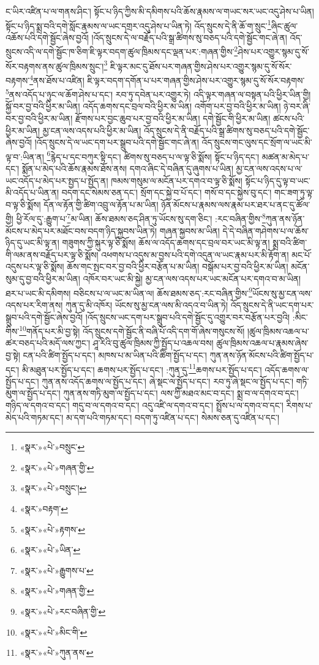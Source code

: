 ང་ཡིར་འཛིན་པ་ལ་གནས་ཤིང་། སྟོང་པ་ཉིད་ཀྱིས་མི་དམིགས་པའི་ཆོས་རྣམས་ལ་གཡང་སར་ཡང་འདུ་ཤེས་པ་ཡིན། སྟོང་པ་ཉིད་སྨྲ་བའི་དགེ་སློང་རྣམས་ལ་ཡང་དགྲར་འདུ་ཤེས་པ་ཡིན་ཏེ། འོད་སྲུངས་དེ་ནི་ཆོ་ག་སྲུང་\footnote{«སྣར་»«པེ་»བསྲུང་}ཞིང་ཚུལ་འཆོས་པའི་དགེ་སྦྱོང་ཞེས་བྱའོ། །འོད་སྲུངས་དེ་ལ་བརྗོད་པའི་སྒྲ་ཚིགས་སུ་བཅད་པའི་དགེ་སྦྱོང་གང་ཞེ་ན། འོད་སྲུངས་འདི་ལ་དགེ་སྦྱོང་ཁ་ཅིག་ཇི་ལྟར་བདག་ཚུལ་ཁྲིམས་དང་ལྡན་པར་:གཞན་གྱིས་\footnote{«སྣར་»«པེ་»གཞན་གྱི་}ཤེས་པར་འགྱུར་སྙམ་དུ་སོ་སོར་བརྟགས་ནས་ཚུལ་ཁྲིམས་སྲུང་།\footnote{«སྣར་»«པེ་»བསྲུང་།} ཇི་ལྟར་མང་དུ་ཐོས་པར་གཞན་གྱིས་ཤེས་པར་འགྱུར་སྙམ་དུ་སོ་སོར་བརྟགས་\footnote{«སྣར་»བརྟག་}ནས་ཐོས་པ་འཛིན། ཇི་ལྟར་བདག་དགོན་པ་པར་གཞན་གྱིས་ཤེས་པར་འགྱུར་སྙམ་དུ་སོ་སོར་བརྟགས་\footnote{«སྣར་»«པེ་»རྟགས་}ནས་འདོད་པ་ཉུང་ལ་ཆོག་ཤེས་པ་དང་། རབ་ཏུ་དབེན་པར་འགྱུར་ཏེ། འདི་ལྟར་གཞན་ལ་བསྟན་པའི་ཕྱིར་ཡིན་གྱི། སྐྱོ་བར་བྱ་བའི་ཕྱིར་མ་ཡིན། འདོད་ཆགས་དང་བྲལ་བའི་ཕྱིར་མ་ཡིན། འགོག་པར་བྱ་བའི་ཕྱིར་མ་ཡིན། ཉེ་བར་ཞི་བར་བྱ་བའི་ཕྱིར་མ་ཡིན། རྫོགས་པར་བྱང་ཆུབ་པར་བྱ་བའི་ཕྱིར་མ་ཡིན། དགེ་སྦྱོང་གི་ཕྱིར་མ་ཡིན། ཚངས་པའི་ཕྱིར་མ་ཡིན། མྱ་ངན་ལས་འདས་པའི་ཕྱིར་མ་ཡིན། འོད་སྲུངས་དེ་ནི་བརྗོད་པའི་སྒྲ་ཚིགས་སུ་བཅད་པའི་དགེ་སྦྱོང་ཞེས་བྱའོ། །འོད་སྲུངས་དེ་ལ་ཡང་དག་པར་སྒྲུབ་པའི་དགེ་སྦྱོང་གང་ཞེ་ན། འོད་སྲུངས་གང་ལུས་དང་སྲོག་ལ་ཡང་མི་ལྟ་བ་:ཡིན་ན། \footnote{«སྣར་»«པེ་»ཡིན་}རྙེད་པ་དང་བཀུར་སྟི་དང་། ཚིགས་སུ་བཅད་པ་ལ་ལྟ་ཅི་སྨོས། སྟོང་པ་ཉིད་དང་། མཚན་མ་མེད་པ་དང་། སྨོན་པ་མེད་པའི་ཆོས་རྣམས་ཐོས་ནས། དགའ་ཞིང་དེ་བཞིན་དུ་ཞུགས་པ་ཡིན། མྱ་ངན་ལས་འདས་པ་ལ་ཡང་འདོད་པ་མེད་པར་སྤྱད་པ་སྤྱོད་ན། ཁམས་གསུམ་ལ་མངོན་པར་དགའ་བ་ལྟ་ཅི་སྨོས། སྟོང་པ་ཉིད་དུ་ལྟ་བ་ཡང་མི་འདོད་པ་ཡིན་ན། བདག་དང་སེམས་ཅན་དང་། སྲོག་དང་སྐྱེ་བ་པོ་དང་། གསོ་བ་དང་སྐྱེས་བུ་དང་། གང་ཟག་ཏུ་ལྟ་བ་ལྟ་ཅི་སྨོས། དོན་ལ་རྟོན་གྱི་ཚིག་འབྲུ་ལ་རྟོན་པ་མ་ཡིན། ཉོན་མོངས་པ་རྣམས་ལས་རྣམ་པར་ཐར་པ་ནང་དུ་ཚོལ་གྱི། ཕྱི་རོལ་དུ་:རྒྱུག་པ་\footnote{«སྣར་»«པེ་»རྒྱུགས་པ་}མ་ཡིན། ཆོས་ཐམས་ཅད་ཤིན་ཏུ་ཡོངས་སུ་དག་ཅིང་། :རང་བཞིན་གྱིས་\footnote{«སྣར་»«པེ་»གཞན་གྱི་}ཀུན་ནས་ཉོན་མོངས་པ་མེད་པར་མཐོང་བས་བདག་ཉིད་སྐྱབས་ཡིན་ཏེ། གཞན་སྐྱབས་མ་ཡིན། དེ་དེ་བཞིན་གཤེགས་པ་ལ་ཆོས་ཉིད་དུ་ཡང་མི་ལྟ་ན། གཟུགས་ཀྱི་སྐུར་ལྟ་ཅི་སྨོས། ཆོས་ལ་འདོད་ཆགས་དང་བྲལ་བར་ཡང་མི་ལྟ་ན། སྨྲ་བའི་ཚིག་གི་ལམ་ནས་བརྗོད་པར་ལྟ་ཅི་སྨོས། འཕགས་པ་འདུས་མ་བྱས་པའི་དགེ་འདུན་ལ་ཡང་རྣམ་པར་མི་རྟོག་ན། མང་པོ་འདུས་པར་ལྟ་ཅི་སྨོས། ཆོས་གང་སྤང་བར་བྱ་བའི་ཕྱིར་བརྩོན་པ་མ་ཡིན། བསྒོམ་པར་བྱ་བའི་ཕྱིར་མ་ཡིན། མངོན་སུམ་དུ་བྱ་བའི་ཕྱིར་མ་ཡིན། འཁོར་བར་ཡང་མི་སྐྱེ། མྱ་ངན་ལས་འདས་པར་ཡང་མངོན་པར་དགའ་བ་མ་ཡིན། ཐར་པ་ཡང་མི་དམིགས། བཅིངས་པ་ལ་ཡང་མ་ཡིན་ལ། ཆོས་ཐམས་ཅད་:རང་བཞིན་གྱིས་\footnote{«སྣར་»«པེ་»རང་བཞིན་གྱི་}ཡོངས་སུ་མྱ་ངན་ལས་འདས་པར་རིག་ནས། ཀུན་དུ་མི་འཁོར། ཡོངས་སུ་མྱ་ངན་ལས་མི་འདའ་བ་ཡིན་ཏེ། འོད་སྲུངས་དེ་ནི་ཡང་དག་པར་སྒྲུབ་པའི་དགེ་སྦྱོང་ཞེས་བྱའོ། །འོད་སྲུངས་ཡང་དག་པར་སྒྲུབ་པའི་དགེ་སྦྱོང་དུ་འགྱུར་བར་བརྩོན་པར་བྱའི། :མིང་གིས་\footnote{«སྣར་»«པེ་»མིང་གི་}གནོད་པར་མི་བྱ་སྟེ། འོད་སྲུངས་དགེ་སྦྱོང་ནི་བཞི་པོ་འདི་དག་གོ་ཞེས་གསུངས་སོ། །ཚུལ་ཁྲིམས་འཆལ་པ་ཚར་བཅད་པའི་མདོ་ལས་ཀྱང་། ཤཱ་རིའི་བུ་ཚུལ་ཁྲིམས་ཀྱི་སྤྱོད་པ་འཆལ་བས། ཚུལ་ཁྲིམས་འཆལ་པ་རྣམས་ཞེས་བྱ་སྟེ། ངན་པའི་ཚིག་སྤྱོད་པ་དང་། མཁས་པ་མ་ཡིན་པའི་ཚིག་སྤྱོད་པ་དང་། ཀུན་ནས་ཉོན་མོངས་པའི་ཚིག་སྤྱོད་པ་དང་། མི་མཐུན་པར་སྤྱོད་པ་དང་། ཆགས་པར་སྤྱོད་པ་དང་། :ཀུན་དུ་\footnote{«སྣར་»«པེ་»ཀུན་ནས་}ཆགས་པར་སྤྱོད་པ་དང་། འདོད་ཆགས་ལ་སྤྱོད་པ་དང་། ཀུན་ནས་འདོད་ཆགས་ལ་སྤྱོད་པ་དང་། ཞེ་སྡང་ལ་སྤྱོད་པ་དང་། རབ་ཏུ་ཞེ་སྡང་ལ་སྤྱོད་པ་དང་། གཏི་མུག་ལ་སྤྱོད་པ་དང་། ཀུན་ནས་གཏི་མུག་ལ་སྤྱོད་པ་དང་། ལས་ཀྱི་མཐའ་མང་བ་དང་། སྨྲ་བ་ལ་དགའ་བ་དང་། གཉིད་ལ་དགའ་བ་དང་། གདུ་བ་ལ་དགའ་བ་དང་། འདུ་འཛི་ལ་དགའ་བ་དང་། སྤྲོས་པ་ལ་དགའ་བ་དང་། རིགས་པ་མེད་པའི་གཏམ་དང་། མ་དག་པའི་གཏམ་དང་། བདག་ཏུ་འཛིན་པ་དང་། སེམས་ཅན་དུ་འཛིན་པ་དང་། 